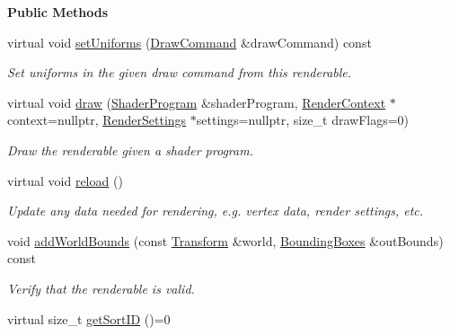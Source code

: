 \begin{Indent}\textbf{ Public Methods}\par
\begin{DoxyCompactItemize}
\item 
virtual void \mbox{\hyperlink{classrev_1_1_renderable_a4418624ac4442899026f95c20e065467}{set\+Uniforms}} (\mbox{\hyperlink{classrev_1_1_draw_command}{Draw\+Command}} \&draw\+Command) const
\begin{DoxyCompactList}\small\item\em Set uniforms in the given draw command from this renderable. \end{DoxyCompactList}\item 
\mbox{\label{classrev_1_1_renderable_af47d53f5444a3c30e53a18b45576acf5}} 
virtual void \mbox{\hyperlink{classrev_1_1_renderable_af47d53f5444a3c30e53a18b45576acf5}{draw}} (\mbox{\hyperlink{classrev_1_1_shader_program}{Shader\+Program}} \&shader\+Program, \mbox{\hyperlink{classrev_1_1_render_context}{Render\+Context}} $\ast$context=nullptr, \mbox{\hyperlink{classrev_1_1_render_settings}{Render\+Settings}} $\ast$settings=nullptr, size\+\_\+t draw\+Flags=0)
\begin{DoxyCompactList}\small\item\em Draw the renderable given a shader program. \end{DoxyCompactList}\item 
virtual void \mbox{\hyperlink{classrev_1_1_renderable_a5acb035c13043156c23602406f1c8819}{reload}} ()
\begin{DoxyCompactList}\small\item\em Update any data needed for rendering, e.\+g. vertex data, render settings, etc. \end{DoxyCompactList}\item 
void \mbox{\hyperlink{classrev_1_1_renderable_a136396ec9244339ac909a566a39b03fb}{add\+World\+Bounds}} (const \mbox{\hyperlink{classrev_1_1_transform}{Transform}} \&world, \mbox{\hyperlink{classrev_1_1_bounding_geometry}{Bounding\+Boxes}} \&out\+Bounds) const
\begin{DoxyCompactList}\small\item\em Verify that the renderable is valid. \end{DoxyCompactList}\item 
\mbox{\label{classrev_1_1_renderable_aa3e4a7497abcf7c5a2f1e9360cc5e094}} 
virtual size\+\_\+t \mbox{\hyperlink{classrev_1_1_renderable_aa3e4a7497abcf7c5a2f1e9360cc5e094}{get\+Sort\+ID}} ()=0

\end{DoxyCompactItemize}
\end{Indent}
